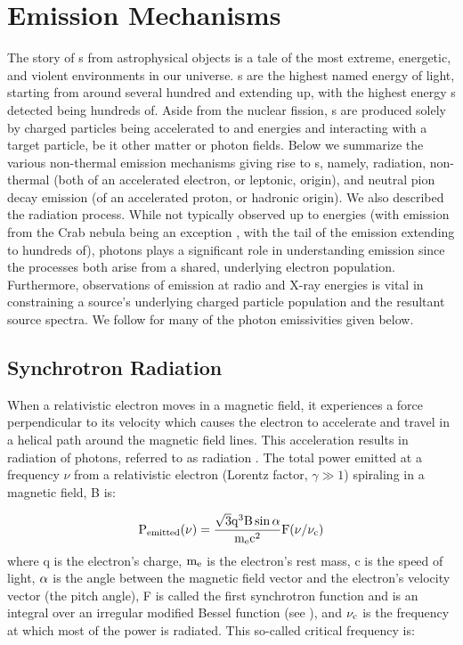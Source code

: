 \section{\gam{} Emission Mechanisms }\label{gamAstr:Emiss}
The story of \gam{}s from astrophysical objects is a tale of the most extreme, energetic, and violent environments in our universe. \gam{}s are the highest named energy of light, starting from around several hundred\kev{} and extending up, with the highest energy \gam{}s detected being hundreds of\tev{}. Aside from the  nuclear fission, \gam{}s are produced solely by charged particles being accelerated to\gev{} and\tev{} energies and interacting with a target particle, be it other matter or photon fields.  Below we summarize the various non-thermal emission mechanisms giving rise to \gam{}s, namely, \ic{} radiation, non-thermal \brems{} (both of an accelerated electron, or leptonic, origin), and neutral pion decay emission (of an accelerated proton, or hadronic origin). We also described the \sync{} radiation process. While not typically observed up to \gam{} energies (with \sync{}  emission from the Crab nebula being an exception \cite{AbdoCrab}, with the tail of the emission extending to hundreds of\mev{}), \sync{} photons plays a significant role in understanding \ic{} \gam{} emission since the processes both arise from a shared, underlying electron population. Furthermore, observations of \sync{} emission at radio and X-ray energies is vital in  constraining a source's underlying charged particle population and the resultant \gam{} source spectra. We follow \cite{Houck06} for many of the photon emissivities given below.

\subsection{Synchrotron Radiation}\label{gamAstr:sync}
When a relativistic electron moves in a magnetic field, it experiences a force perpendicular to its velocity which causes the electron to accelerate and travel in a helical path around the magnetic field lines. This acceleration results in radiation of photons, referred to as \sync{} radiation \cite{Blumenthal70,Pacholczyk70,Rybicki86,Longair11}. The total power emitted at a frequency $\nu$ from a relativistic electron (Lorentz factor, $\gamma \gg 1$) spiraling in a magnetic field, B is:

\begin{equation}\label{eq:syncPow}
{\rm P_{emitted}(\nu) = 
\frac{\sqrt{3} q^3 B \sin\alpha}{m_e c^2} F(\nu/\nu_c) }
\end{equation}
where q is the electron's charge,  ${\rm m_e}$ is the electron's rest mass, c is the speed of light,  ${\rm \alpha }$ is the angle between the magnetic field vector and the electron's velocity vector (the pitch angle), F is called the first synchrotron function and is an integral over an irregular modified Bessel function (see \cite{Rybicki86}), and ${\rm \nu_c}$ is the frequency at which most of the power is radiated. This so-called critical frequency is:

